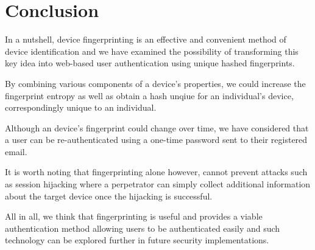 \documentclass{acm_proc_article-sp}
\begin{document}
\section{Conclusion}
In a nutshell, device fingerprinting is an effective and convenient method of device identification and we have examined the possibility of transforming this key idea into web-based user authentication using unique hashed fingerprints.

By combining various components of a device's properties, we could increase the fingerprint entropy as well as obtain a hash unqiue for an individual's device, correspondingly unique to an individual.

Although an device's fingerprint could change over time, we have considered that a user can be re-authenticated using a one-time password sent to their registered email.

It is worth noting that fingerprinting alone however, cannot prevent attacks such as session hijacking where a perpetrator can simply collect additional information about the target device once the hijacking is successful.

All in all, we think that fingerprinting is useful and provides a viable authentication method allowing users to be authenticated easily and such technology can be explored further in future security implementations.


\end{document}
